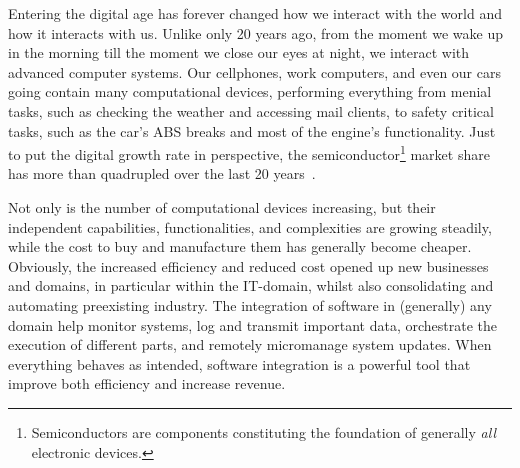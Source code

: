 %

Entering the digital age has forever changed how we interact with the world and how it interacts with us.
Unlike only 20 years ago, from the moment we wake up in the morning till the moment we close our eyes at night, we interact with advanced computer systems.
Our cellphones, work computers, and even our cars going contain many computational devices, performing everything from menial tasks, such as checking the weather and accessing mail clients, to safety critical tasks, such as the car's ABS breaks and most of the engine's functionality.
Just to put the digital growth rate in perspective, the semiconductor\footnote{Semiconductors are components constituting the foundation of generally \emph{all} electronic devices.} market share has more than quadrupled over the last 20 years~\cite{statista:2022}.

Not only is the number of computational devices increasing, but their independent capabilities, functionalities, and complexities are growing steadily, while the cost to buy and manufacture them has generally become cheaper.
Obviously, the increased efficiency and reduced cost opened up new businesses and domains, in particular within the IT-domain, whilst also consolidating and automating preexisting industry.
The integration of software in (generally) any domain help monitor systems, log and transmit important data, orchestrate the execution of different parts, and remotely micromanage system updates.
When everything behaves as intended, software integration is a powerful tool that improve both efficiency and increase revenue.

